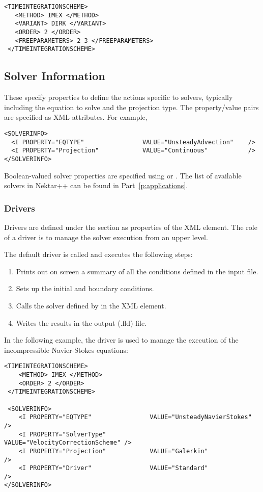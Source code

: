 \begin{lstlisting}[style=XMLStyle]
 <TIMEINTEGRATIONSCHEME>
   <METHOD> IMEX </METHOD>
   <VARIANT> DIRK </VARIANT>
   <ORDER> 2 </ORDER>
   <FREEPARAMETERS> 2 3 </FREEPARAMETERS>
 </TIMEINTEGRATIONSCHEME>
\end{lstlisting}

\subsection{Solver Information}

These specify properties to define the actions specific to solvers,
typically including the equation to solve and the projection type. The
property/value pairs are specified as XML attributes. For example,

\begin{lstlisting}[style=XMLStyle] 
<SOLVERINFO>
  <I PROPERTY="EQTYPE"                VALUE="UnsteadyAdvection"    /> 
  <I PROPERTY="Projection"            VALUE="Continuous"           /> 
</SOLVERINFO>
\end{lstlisting}

Boolean-valued solver properties are specified using  or . The list of available solvers in Nektar++ can be found in
Part~\ref{p:applications}.

\subsubsection{Drivers}
Drivers are defined under the  section as properties of the 
 XML element. The role of a driver is to manage the solver 
execution from an upper level. 

The default driver is called  and executes the following steps:
\begin{enumerate}
\item Prints out on screen a summary of all the conditions defined in the input file.
\item Sets up the initial and boundary conditions.
\item Calls the solver defined by   in the  XML element.
\item Writes the results in the output (.fld) file.
\end{enumerate}

In the following example, the driver  is used to manage the 
execution of the incompressible Navier-Stokes equations:
\begin{lstlisting}[style=XMLStyle]
 <TIMEINTEGRATIONSCHEME>
    <METHOD> IMEX </METHOD>
    <ORDER> 2 </ORDER>
 </TIMEINTEGRATIONSCHEME>

 <SOLVERINFO>
    <I PROPERTY="EQTYPE"                VALUE="UnsteadyNavierStokes"     />
    <I PROPERTY="SolverType"            VALUE="VelocityCorrectionScheme" />
    <I PROPERTY="Projection"            VALUE="Galerkin"                 />
    <I PROPERTY="Driver"                VALUE="Standard"                 />
</SOLVERINFO>
\end{lstlisting}

